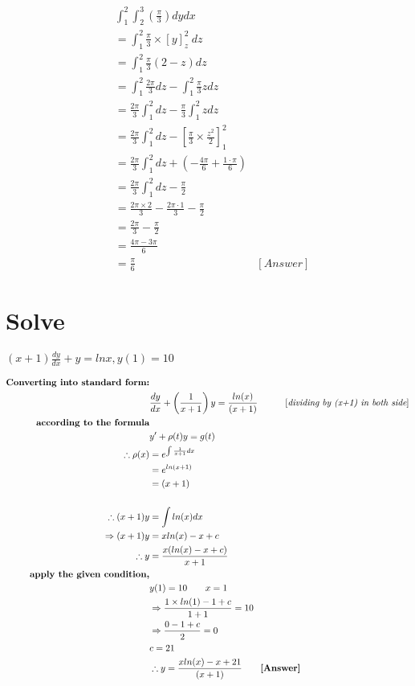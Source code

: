 \documentclass[12pt]{article}
\begin{document}
\begin{align*}
    &\int_{1}^{2} \int_{2}^{3} (\frac{\pi}{3}) dy dx\\[3mm]
    &= \int_{1}^{2} \frac{\pi}{3} \times [y]_{z}^{2} \ dz\\[3mm]
    &= \int_{1}^{2} \frac{\pi}{3} (2-z) dz\\[3mm]
    &= \int_{1}^{2} \frac{2\pi}{3} dz - \int_{1}^{2} \frac{\pi}{3} z dz\\[3mm]
    &= \frac{2\pi}{3} \int_{1}^{2} dz - \frac{\pi}{3} \int_{1}^{2} z dz\\[3mm]
    &= \frac{2\pi}{3} \int_{1}^{2} dz - \left[ \frac{\pi}{3} \times \frac{z^2}{2}\right]_{1}^{2}\\
    &= \frac{2\pi}{3} \int_{1}^{2} dz + (- \frac{4 \pi}{6} + \frac{1 \cdot \pi }{6})\\[3mm]
    &= \frac{2\pi}{3} \int_{1}^{2} dz - \frac{\pi}{2}\\[3mm]
    &= \frac{2 \pi \times 2}{3} - \frac{2\pi \cdot 1}{3} - \frac{\pi}{2}\\[3mm]
    &= \frac{2\pi}{3} - \frac{\pi}{2}\\[3mm]
    &= \frac{4\pi-3\pi}{6}\\[3mm]
    &= \frac{\pi}{6} &[Answer]
\end{align*}
\pagebreak 
\section{Solve}
\centering $(x+1) \frac{dy}{dx} + y = lnx, y(1) = 10$

\renewcommand{\baselinestretch}{2.0}
\begin{align*}
    \textbf{Converting into standard form:}&\\
    & \frac{dy}{dx} + \left(\frac{1}{x+1}\right) y = \frac{ln(x)}{(x+1)} \ \ \ \ \ \ \ \ \ [\textit{dividing by (x+1) in both side}]\\
    \textbf{according to the formula}&\\
    &y{'} + \rho (t) y = g(t)\\
    \therefore \rho(x) &= e^{\int \frac{1}{x+1}dx}\\
    &= e^{ln(x+1)}\\
    &= (x+1)\\\\
    \raggedright\therefore (x+1) y &= \int ln(x)dx\\
    \Rightarrow(x+1)y &= xln(x) - x + c\\
    \therefore y &= \frac{x(ln(x)-x+c)}{x+1}\\
    \textbf{apply the given condition,}\\
    &y(1) = 10\qquad  x=1\\
    &\Rightarrow \frac{1\times ln(1)-1+c}{1+1} = 10\\
    &\Rightarrow \frac{0-1+c}{2} = 0\\
    &c = 21\\
    &\therefore y = \frac{xln(x) - x + 21}{(x+1)}\qquad \textbf{[Answer]}
\end{align*}
\pagebreak
\end{document}
